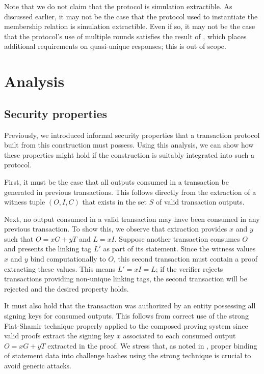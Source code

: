 \documentclass{article}
\theoremstyle{definition}
\begin{document}
Note that we do not claim that the protocol is simulation extractible.
As discussed earlier, it may not be the case that the protocol used to instantiate the membership relation is simulation extractible.
Even if so, it may not be the case that the protocol's use of multiple rounds satisfies the result of \cite{bp_rom}, which places additional requirements on quasi-unique responses; this is out of scope.


\section{Analysis}


\subsection{Security properties}

Previously, we introduced informal security properties that a transaction protocol built from this construction must possess.
Using this analysis, we can show how these properties might hold if the construction is suitably integrated into such a protocol.

First, it must be the case that all outputs consumed in a transaction be generated in previous transactions.
This follows directly from the extraction of a witness tuple $(O, I, C)$ that exists in the set $S$ of valid transaction outputs.

Next, no output consumed in a valid transaction may have been consumed in any previous transaction.
To show this, we observe that extraction provides $x$ and $y$ such that $O = x G + y T$ and $L = x I$.
Suppose another transaction consumes $O$ and presents the linking tag $L'$ as part of its statement.
Since the witness values $x$ and $y$ bind computationally to $O$, this second transaction must contain a proof extracting these values.
This means $L' = x I = L$; if the verifier rejects transactions providing non-unique linking tags, the second transaction will be rejected and the desired property holds.

It must also hold that the transaction was authorized by an entity possessing all signing keys for consumed outputs.
This follows from correct use of the strong Fiat-Shamir technique properly applied to the composed proving system since valid proofs extract the signing key $x$ associated to each consumed output $O = x G + y T$ extracted in the proof.
We stress that, as noted in \cite{fs}, proper binding of statement data into challenge hashes using the strong technique is crucial to avoid generic attacks.
\end{document}
